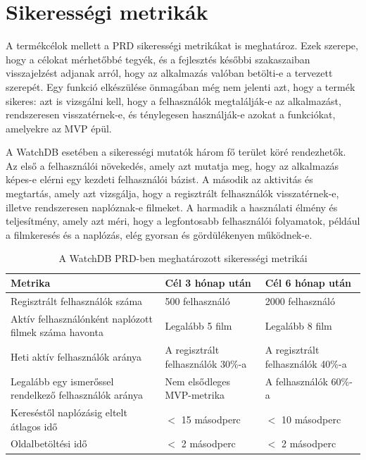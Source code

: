 \section{Sikerességi metrikák}

A termékcélok mellett a PRD sikerességi metrikákat is meghatároz. Ezek szerepe, hogy a célokat mérhetőbbé tegyék, és a fejlesztés későbbi szakaszaiban visszajelzést adjanak arról, hogy az alkalmazás valóban betölti-e a tervezett szerepét. Egy funkció elkészülése önmagában még nem jelenti azt, hogy a termék sikeres: azt is vizsgálni kell, hogy a felhasználók megtalálják-e az alkalmazást, rendszeresen visszatérnek-e, és ténylegesen használják-e azokat a funkciókat, amelyekre az MVP épül.

A WatchDB esetében a sikerességi mutatók három fő terület köré rendezhetők. Az első a felhasználói növekedés, amely azt mutatja meg, hogy az alkalmazás képes-e elérni egy kezdeti felhasználói bázist. A második az aktivitás és megtartás, amely azt vizsgálja, hogy a regisztrált felhasználók visszatérnek-e, illetve rendszeresen naplóznak-e filmeket. A harmadik a használati élmény és teljesítmény, amely azt méri, hogy a legfontosabb felhasználói folyamatok, például a filmkeresés és a naplózás, elég gyorsan és gördülékenyen működnek-e.

\begin{table}[H]
\centering
\renewcommand{\arraystretch}{1.25}
\begin{tabular}{|p{}|p{}|p{}|}
\hline
\textbf{Metrika} & \textbf{Cél 3 hónap után} & \textbf{Cél 6 hónap után} \\
\hline
Regisztrált felhasználók száma & 500 felhasználó & 2000 felhasználó \\
\hline
Aktív felhasználónként naplózott filmek száma havonta & Legalább 5 film & Legalább 8 film \\
\hline
Heti aktív felhasználók aránya & A regisztrált felhasználók 30\%-a & A regisztrált felhasználók 40\%-a \\
\hline
Legalább egy ismerőssel rendelkező felhasználók aránya & Nem elsődleges MVP-metrika & A felhasználók 60\%-a \\
\hline
Kereséstől naplózásig eltelt átlagos idő & $<$ 15 másodperc & $<$ 10 másodperc \\
\hline
Oldalbetöltési idő & $<$ 2 másodperc & $<$ 2 másodperc \\
\hline
\end{tabular}
\caption{A WatchDB PRD-ben meghatározott sikerességi metrikái}
\label{tab:watchdb-success-metrics}
\end{table}

